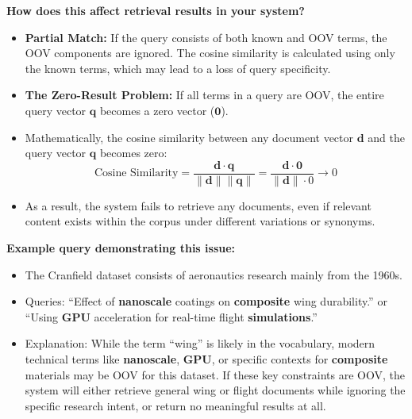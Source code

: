 \textbf{How does this affect retrieval results in your system?}
\begin{itemize}
    \item \textbf{Partial Match:} If the query consists of both known and OOV terms, the OOV components are ignored. The cosine similarity is calculated using only the known terms, which may lead to a loss of query specificity.
    \item \textbf{The Zero-Result Problem:} If all terms in a query are OOV, the entire query vector $\mathbf{q}$ becomes a zero vector ($\mathbf{0}$).
    \item Mathematically, the cosine similarity between any document vector $\mathbf{d}$ and the query vector $\mathbf{q}$ becomes zero:
    \[
    \text{Cosine Similarity} = \frac{\mathbf{d} \cdot \mathbf{q}}{\|\mathbf{d}\| \|\mathbf{q}\|} = \frac{\mathbf{d} \cdot \mathbf{0}}{\|\mathbf{d}\| \cdot 0} \rightarrow 0
    \]
    \item As a result, the system fails to retrieve any documents, even if relevant content exists within the corpus under different variations or synonyms.
\end{itemize}

\textbf{Example query demonstrating this issue:}
\begin{itemize}
    \item The Cranfield dataset consists of aeronautics research mainly from the 1960s.
    \item Queries: ``Effect of \textbf{nanoscale} coatings on \textbf{composite} wing durability.'' or ``Using \textbf{GPU} acceleration for real-time flight \textbf{simulations}.''
    \item Explanation: While the term ``wing'' is likely in the vocabulary, modern technical terms like \textbf{nanoscale}, \textbf{GPU}, or specific contexts for \textbf{composite} materials may be OOV for this dataset. If these key constraints are OOV, the system will either retrieve general wing or flight documents while ignoring the specific research intent, or return no meaningful results at all.
\end{itemize}
